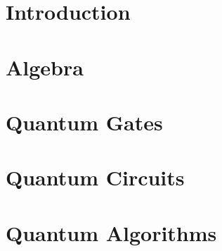 



\newpage
\section{Introduction}
		


\section{Algebra}
		
		
		
\section{Quantum Gates}
		
		

\section{Quantum Circuits}
		
		
		
		
\section{Quantum Algorithms}
		
		
		














